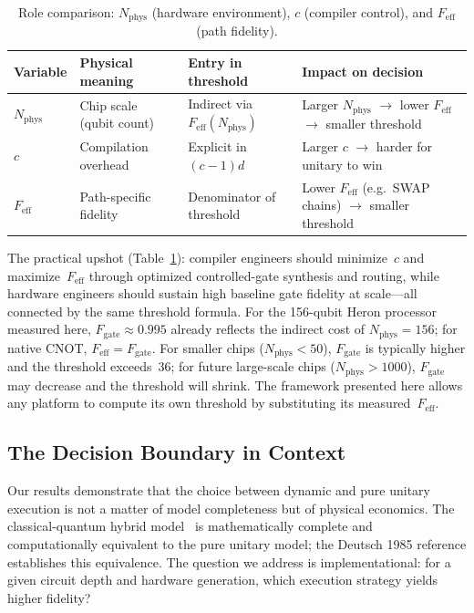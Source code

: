 \documentclass[11pt]{article}
\begin{document}
\begin{table}[!t]
\centering
\caption{Role comparison: $N_{\text{phys}}$ (hardware environment), $c$ (compiler control), and $F_{\text{eff}}$ (path fidelity).}
\begin{tabular}{@{}llll@{}}
\toprule
Variable & Physical meaning & Entry in threshold & Impact on decision \\
\midrule
$N_{\text{phys}}$ & Chip scale (qubit count) & Indirect via $F_{\text{eff}}(N_{\text{phys}})$ & Larger $N_{\text{phys}}$ $\to$ lower $F_{\text{eff}}$ $\to$ smaller threshold \\
$c$ & Compilation overhead & Explicit in $(c{-}1)d$ & Larger $c$ $\to$ harder for unitary to win \\
$F_{\text{eff}}$ & Path-specific fidelity & Denominator of threshold & Lower $F_{\text{eff}}$ (e.g.\ SWAP chains) $\to$ smaller threshold \\
\bottomrule
\end{tabular}
\label{tab:role_comparison}
\end{table}

The practical upshot (Table~\ref{tab:role_comparison}): compiler engineers should minimize~$c$ and maximize~$F_{\text{eff}}$ through optimized controlled-gate synthesis and routing, while hardware engineers should sustain high baseline gate fidelity at scale---all connected by the same threshold formula.
For the 156-qubit Heron processor measured here, $F_{\text{gate}} \approx 0.995$ already reflects the indirect cost of $N_{\text{phys}} = 156$; for native CNOT, $F_{\text{eff}} = F_{\text{gate}}$.
For smaller chips ($N_{\text{phys}} < 50$), $F_{\text{gate}}$ is typically higher and the threshold exceeds~36; for future large-scale chips ($N_{\text{phys}} > 1000$), $F_{\text{gate}}$ may decrease and the threshold will shrink.
The framework presented here allows any platform to compute its own threshold by substituting its measured~$F_{\text{eff}}$.

\subsection{The Decision Boundary in Context}

Our results demonstrate that the choice between dynamic and pure unitary execution is not a matter of model completeness but of physical economics.
The classical-quantum hybrid model~\cite{deutsch1985,ibm_dynamic,openqasm3} is mathematically complete and computationally equivalent to the pure unitary model; the Deutsch 1985 reference establishes this equivalence.
The question we address is implementational: for a given circuit depth and hardware generation, which execution strategy yields higher fidelity?
\end{document}

